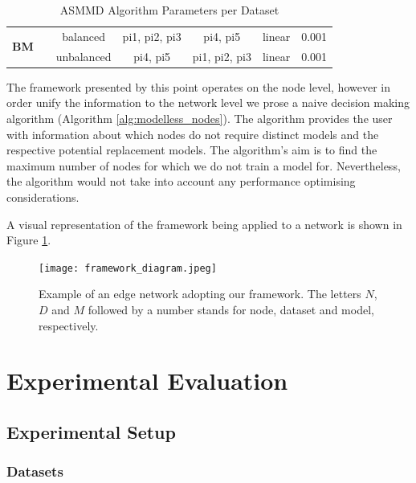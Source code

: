 \documentclass{mpaper}
\begin{document}
\begin{table}[]
\begin{tabular}{|ccc|cccc|}
\multicolumn{1}{|c|}{\multirow{2}{*}{\textbf{BM}}}    & \multicolumn{1}{c|}{}                    & balanced           & \multicolumn{1}{c|}{pi1, pi2, pi3}           & \multicolumn{1}{c|}{pi4, pi5}              & \multicolumn{1}{c|}{linear}          & 0.001              \\
\multicolumn{1}{|c|}{}                                & \multicolumn{1}{c|}{}                    & unbalanced         & \multicolumn{1}{c|}{pi4, pi5}                & \multicolumn{1}{c|}{pi1, pi2, pi3}         & \multicolumn{1}{c|}{linear}          & 0.001              \\ \hline
\end{tabular}
\caption{\label{tab:asmmd_parameters} ASMMD Algorithm Parameters per Dataset}
\end{table}

The framework presented by this point operates on the node level, however in order unify the information to the network level we prose a naive decision making algorithm (Algorithm \ref{alg:modelless_nodes}). The algorithm provides the user with information about which nodes do not require distinct models and the respective potential replacement models. The algorithm's aim is to find the maximum number of nodes for which we do not train a model for. Nevertheless, the algorithm would not take into account any performance optimising considerations. 

A visual representation of the framework being applied to a network is shown in Figure \ref{fig:framework}. 

\begin{figure}
    \centering
    \texttt{[image: framework\_diagram.jpeg]}
    \caption{Example of an edge network adopting our framework. The letters $N$, $D$ and $M$ followed by a number stands for node, dataset and model, respectively.}
    \label{fig:framework}
\end{figure}

\section{Experimental Evaluation}

\subsection{Experimental Setup}

\subsubsection{Datasets}\label{chap:training_data}
\end{document}
